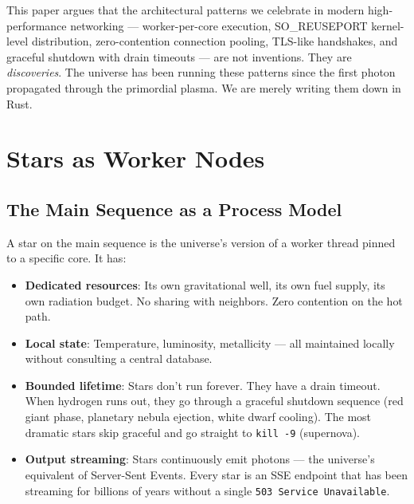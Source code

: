 \documentclass[12pt,a4paper]{article}
\begin{document}
This paper argues that the architectural patterns we celebrate in modern
high-performance networking --- worker-per-core execution, SO\_REUSEPORT
kernel-level distribution, zero-contention connection pooling, TLS-like
handshakes, and graceful shutdown with drain timeouts --- are not inventions.
They are \emph{discoveries}. The universe has been running these patterns
since the first photon propagated through the primordial plasma. We are merely
writing them down in Rust.

\section{Stars as Worker Nodes}

\subsection{The Main Sequence as a Process Model}

A star on the main sequence is the universe's version of a worker thread pinned
to a specific core. It has:

\begin{itemize}[leftmargin=2cm]
    \item[\color{amber}$\star$] \textbf{Dedicated resources}: Its own gravitational
    well, its own fuel supply, its own radiation budget. No sharing with neighbors.
    Zero contention on the hot path.

    \item[\color{amber}$\star$] \textbf{Local state}: Temperature, luminosity,
    metallicity --- all maintained locally without consulting a central database.

    \item[\color{amber}$\star$] \textbf{Bounded lifetime}: Stars don't run forever.
    They have a drain timeout. When hydrogen runs out, they go through a graceful
    shutdown sequence (red giant phase, planetary nebula ejection, white dwarf
    cooling). The most dramatic stars skip graceful and go straight to
    \texttt{kill -9} (supernova).

    \item[\color{amber}$\star$] \textbf{Output streaming}: Stars continuously emit
    photons --- the universe's equivalent of Server-Sent Events. Every star is an
    SSE endpoint that has been streaming for billions of years without a single
    \texttt{503 Service Unavailable}.
\end{itemize}
\end{document}

